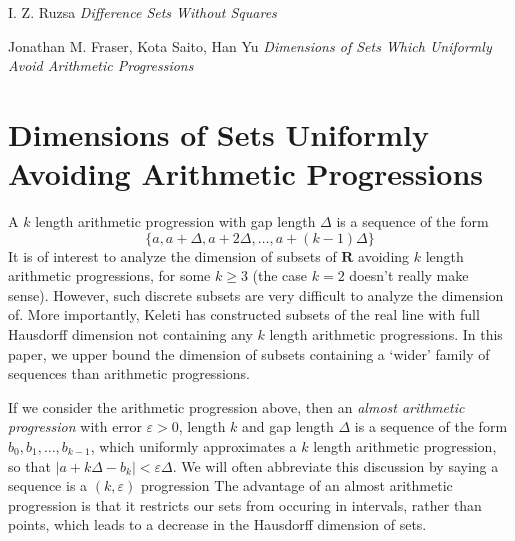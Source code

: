 \documentclass{article}
\theoremstyle{plain}
\theoremstyle{plain}
\begin{document}
\begin{thebibliography}{9}

I. Z. Ruzsa
\textit{Difference Sets Without Squares}

Jonathan M. Fraser, Kota Saito, Han Yu
\textit{Dimensions of Sets Which Uniformly Avoid Arithmetic Progressions}

\end{thebibliography}

\section{Dimensions of Sets Uniformly Avoiding Arithmetic Progressions}

A $k$ length arithmetic progression with gap length $\Delta$ is a sequence of the form
%
\[ \{ a, a + \Delta, a + 2 \Delta, \dots, a + (k-1) \Delta \} \]
%
It is of interest to analyze the dimension of subsets of $\mathbf{R}$ avoiding $k$ length arithmetic progressions, for some $k \geq 3$ (the case $k = 2$ doesn't really make sense). However, such discrete subsets are very difficult to analyze the dimension of. More importantly, Keleti has constructed subsets of the real line with full Hausdorff dimension not containing any $k$ length arithmetic progressions. In this paper, we upper bound the dimension of subsets containing a `wider' family of sequences than arithmetic progressions.

If we consider the arithmetic progression above, then an {\it almost arithmetic progression} with error $\varepsilon > 0$, length $k$ and gap length $\Delta$ is a sequence of the form $b_0, b_1, \dots, b_{k-1}$, which uniformly approximates a $k$ length arithmetic progression, so that $|a + k \Delta - b_k| < \varepsilon \Delta$. We will often abbreviate this discussion by saying a sequence is a $(k,\varepsilon)$ progression The advantage of an almost arithmetic progression is that it restricts our sets from occuring in intervals, rather than points, which leads to a decrease in the Hausdorff dimension of sets.
\end{document}
